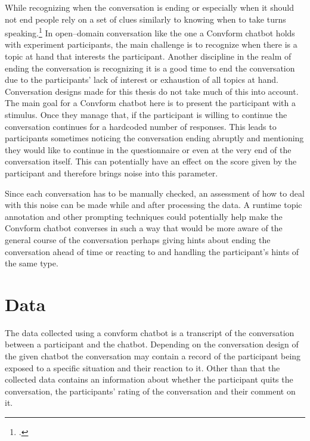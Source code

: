 \documentclass[12pt]{report}
\begin{document}
{While recognizing when the conversation is ending
or especially when it should not end
people rely on a set of clues
similarly to knowing when to take turns speaking.\footcite{closing1,davidson1975ending,coppock2005politeness}
In open–domain conversation
like the one a Convform chatbot holds with experiment participants,
the main challenge is to recognize
when there is a topic at hand
that interests the participant.
Another discipline in the realm of ending the conversation
is recognizing it is a good time to end the conversation
due to the participants' lack of interest or exhaustion of all topics at hand.
Conversation designs made for this thesis
do not take much of this into account.
The main goal for a Convform chatbot here
is to present the participant with a stimulus.
Once they manage that,
if the participant is willing to continue
the conversation continues for a hardcoded number of responses.
This leads to participants sometimes noticing
the conversation ending abruptly
and mentioning they would like to continue
in the questionnaire
or even at the very end of the conversation itself.
This can potentially have an effect on
the score given by the participant
and therefore brings noise into this parameter.

\par
Since each conversation has to be manually checked,
an assessment of how to deal with this noise can be made
while and after processing the data.
A runtime topic annotation
and other prompting techniques
could potentially help make
the Convform chatbot converses in such a way
that would be more aware of the general course of the conversation
perhaps giving hints about ending the conversation ahead of time
or reacting to and handling the participant's hints of the same type.

\chapter{Data}

The data collected using a convform chatbot
is a transcript of the conversation
between a participant and the chatbot.
Depending on the conversation design of the given chatbot
the conversation may contain a record of
the participant being exposed to a specific situation
and their reaction to it.
Other than that the collected data contains
an information about whether the participant quits the conversation,
the participants' rating of the conversation
and their comment on it.

}
\end{document}
